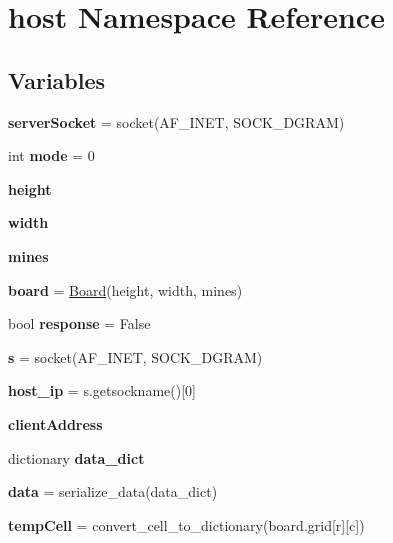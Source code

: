 \hypertarget{namespacehost}{}\section{host Namespace Reference}
\label{namespacehost}
\subsection*{Variables}
\begin{DoxyCompactItemize}
\item 
\mbox{\label{namespacehost_a2f80dadba484200e570a76f7da6be649}} 
{\bfseries server\+Socket} = socket(A\+F\+\_\+\+I\+N\+ET, S\+O\+C\+K\+\_\+\+D\+G\+R\+AM)
\item 
\mbox{\label{namespacehost_a5f6106680a6c6401191db0633d1af66f}} 
int {\bfseries mode} = 0
\item 
\mbox{\label{namespacehost_a54fb6ea367ea77b46ec4c7c5039a5ee2}} 
{\bfseries height}
\item 
\mbox{\label{namespacehost_acd576bc5fea4a55f91c3a6caacaf5fa5}} 
{\bfseries width}
\item 
\mbox{\label{namespacehost_a5ce4996febf6a1d8a3f15308021151b1}} 
{\bfseries mines}
\item 
\mbox{\label{namespacehost_ab2757d06fb4592190609a0514d9e4ffd}} 
{\bfseries board} = \hyperlink{class_board_1_1_board}{Board}(height, width, mines)
\item 
\mbox{\label{namespacehost_aae86faa74ad32fcf0ecf13de2667a52a}} 
bool {\bfseries response} = False
\item 
\mbox{\label{namespacehost_ad873f768eeedb8bca7db18cc251c7053}} 
{\bfseries s} = socket(A\+F\+\_\+\+I\+N\+ET, S\+O\+C\+K\+\_\+\+D\+G\+R\+AM)
\item 
\mbox{\label{namespacehost_a21cb3c882570d7bac4b4f9ed2e28f3c7}} 
{\bfseries host\+\_\+ip} = s.\+getsockname()\mbox{[}0\mbox{]}
\item 
\mbox{\label{namespacehost_aedee2c2f1424cd07fcb9a97263ff6b2e}} 
{\bfseries client\+Address}
\item 
dictionary {\bfseries data\+\_\+dict}
\item 
\mbox{\label{namespacehost_a50c4cab8ef7df36e4ed8fb1ca388eb18}} 
{\bfseries data} = serialize\+\_\+data(data\+\_\+dict)
\item 
\mbox{\label{namespacehost_a9b9415201f6e29d0eda621113efe49ba}} 
{\bfseries temp\+Cell} = convert\+\_\+cell\+\_\+to\+\_\+dictionary(board.\+grid\mbox{[}r\mbox{]}\mbox{[}c\mbox{]})
\end{DoxyCompactItemize}


